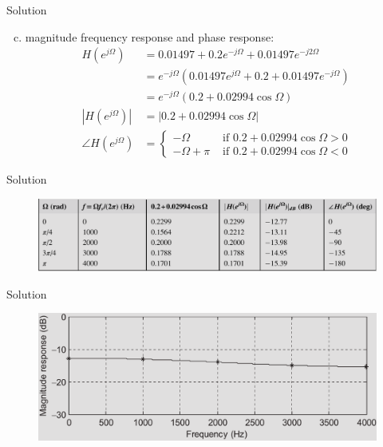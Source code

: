 \documentclass[pdflatex,compress,mathserif]{beamer}
\begin{document}
\begin{frame}{Solution}
    \begin{enumerate}[a.]
        \setcounter{enumi}{2}
        \item  magnitude frequency response and phase response:
        \begin{align*}
            H(e^{j \Omega}) &= 0.01497 + 0.2 e^{-j \Omega} + 0.01497e^{-j2 \Omega} \\
            &= e^{-j \Omega} (0.01497e^{j \Omega} + 0.2  + 0.01497e^{-j \Omega}) \\
            &= e^{-j \Omega} (0.2 + 0.02994 \cos \Omega) \\
            |H(e^{j \Omega})| &= |0.2 + 0.02994 \cos \Omega| \\ 
            \angle H(e^{j \Omega}) &= \begin{cases}
                - \Omega &\text{ if } 0.2 + 0.02994 \cos \Omega > 0 \\
                - \Omega + \pi &\text{ if } 0.2 + 0.02994 \cos \Omega < 0
            \end{cases}
        \end{align*}
    \end{enumerate}
\end{frame}

\begin{frame}{Solution}
    \begin{figure}
        \centering
        \includegraphics[width=\linewidth]{./img/img23.png}
    \end{figure}
\end{frame}

\begin{frame}{Solution}
    \begin{figure}
        \centering
        \includegraphics[width=\linewidth]{./img/img24.png}
    \end{figure}
\end{frame}
\end{document}
